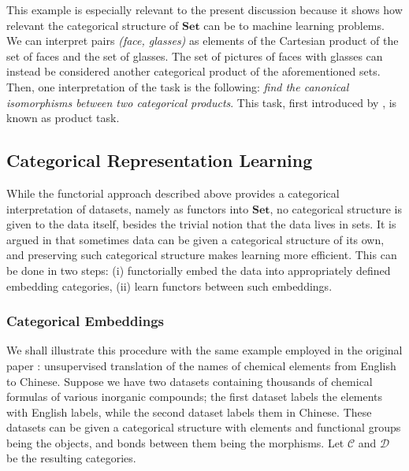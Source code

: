 \documentclass[11pt,a4paper,openright,twoside]{report}
\theoremstyle{plain}
\theoremstyle{definition}
\begin{document}
This example is especially relevant to the present discussion because it shows how relevant the categorical structure of $\mathbf{Set}$ can be to machine learning problems. We can interpret pairs \textit{(face, glasses)} as elements of the Cartesian product of the set of faces and the set of glasses. The set of pictures of faces with glasses can instead be considered another categorical product of the aforementioned sets. Then, one interpretation of the task is the following: \textit{find the canonical isomorphisms between two categorical products}. This task, first introduced by \cite{gavranovicLearningFunctorsUsing2020}, is known as product task.





\subsection{Categorical Representation Learning}


While the functorial approach described above provides a categorical interpretation of datasets, namely as functors into $\mathbf{Set}$, no categorical structure is given to the data itself, besides the trivial notion that the data lives in sets. It is argued in \cite{sheshmaniCategoricalRepresentationLearning2022} that sometimes data can be given a categorical structure of its own, and preserving such categorical structure makes learning more efficient. This can be done in two steps: (i) functorially embed the data into appropriately defined embedding categories, (ii) learn functors between such embeddings. 


\subsubsection{Categorical Embeddings}

We shall illustrate this procedure with the same example employed in the original paper \cite{sheshmaniCategoricalRepresentationLearning2022}: unsupervised translation of the names of chemical elements from English to Chinese. Suppose we have two datasets containing thousands of chemical formulas of various inorganic compounds; the first dataset labels the elements with English labels, while the second dataset labels them in Chinese. These datasets can be given a categorical structure with elements and functional groups being the objects, and bonds between them being the morphisms. Let $\mathcal{C}$ and $\mathcal{D}$ be the resulting categories.
\end{document}
